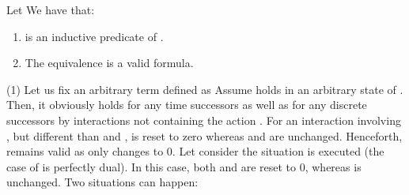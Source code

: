 \documentclass{LMCS}
\theoremstyle{plain}\newtheorem{remark}[thm]{Remark}
\theoremstyle{plain}\newtheorem{example}[thm]{Example}
\begin{document}
\begin{prop} \label{p:cI} 
 Let 
We have that:
\begin{enumerate}\item  is an inductive predicate of .
\item The equivalence  is a valid formula.
\end{enumerate}
\end{prop}
\proof (1) Let us fix an arbitrary term  defined as 
 Assume
 holds in an arbitrary state  of .
Then, it obviously holds for any time successors as well as for any
discrete successors by interactions not containing the action .
For an interaction involving , but different than  and
,  is reset to zero whereas  and  are
unchanged.  Henceforth,  remains valid as only
 changes to 0.  Let consider the situation  is executed
(the case of  is perfectly dual).  In this case, both  and
 are reset to 0, whereas  is unchanged.  Two
situations can happen:
\end{document}
